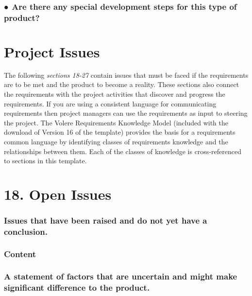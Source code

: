 \documentclass[
]{article}
\begin{document}
\hypertarget{are-there-any-special-development-steps-for-this-type-of-product}{%
\subsubsection{● Are there any special development steps for this type
of
product?}\label{are-there-any-special-development-steps-for-this-type-of-product}}

\hypertarget{project-issues-1}{%
\section{Project Issues}\label{project-issues-1}}

The following \emph{sections 18-27} contain issues that must be faced if
the requirements are to be met and the product to become a reality.
These sections also connect the requirements with the project activities
that discover and progress the requirements. If you are using a
consistent language for communicating requirements then project managers
can use the requirements as input to steering the project. The Volere
Requirements Knowledge Model (included with the download of Version 16
of the template) provides the basis for a requirements common language
by identifying classes of requirements knowledge and the relationships
between them. Each of the classes of knowledge is cross-referenced to
sections in this template.

\hypertarget{open-issues}{%
\section{\texorpdfstring{18. Open Issues
}{18. Open Issues }}\label{open-issues}}

\hypertarget{issues-that-have-been-raised-and-do-not-yet-have-a-conclusion.}{%
\subsubsection{Issues that have been raised and do not yet have a
conclusion.}\label{issues-that-have-been-raised-and-do-not-yet-have-a-conclusion.}}

\hypertarget{content-60}{%
\subsubsection{Content}\label{content-60}}

\hypertarget{a-statement-of-factors-that-are-uncertain-and-might-make-significant-difference-to-the-product.}{%
\subsubsection{\texorpdfstring{A statement of factors that are uncertain
and might make significant difference to the product.
}{A statement of factors that are uncertain and might make significant difference to the product. }}\label{a-statement-of-factors-that-are-uncertain-and-might-make-significant-difference-to-the-product.}}
\end{document}

